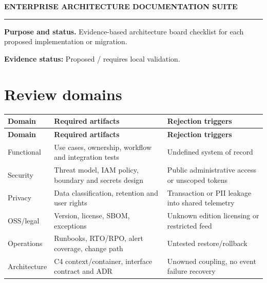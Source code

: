 \documentclass[10pt,letterpaper]{article}
\begin{document}
\begin{center}
{\large\bfseries\color{teal} ENTERPRISE ARCHITECTURE DOCUMENTATION SUITE}\par
{}\par
{}\par
\end{center}
\vspace{8pt}\hrule\vspace{12pt}
\textbf{Purpose and status.} Evidence-based architecture board checklist for each proposed implementation or migration.\par
\textbf{Evidence status:} Proposed / requires local validation.\par
\section{Review domains}
\small\begin{longtable}{>{\raggedright\arraybackslash}p{}>{\raggedright\arraybackslash}p{}>{\raggedright\arraybackslash}p{}}
\toprule
\textbf{Domain} & \textbf{Required artifacts} & \textbf{Rejection triggers}\\
\midrule\endfirsthead
\toprule
\textbf{Domain} & \textbf{Required artifacts} & \textbf{Rejection triggers}\\
\midrule\endhead
Functional & Use cases, ownership, workflow and integration tests & Undefined system of record\\
Security & Threat model, IAM policy, boundary and secrets design & Public administrative access or unscoped tokens\\
Privacy & Data classification, retention and user rights & Transaction or PII leakage into shared telemetry\\
OSS/legal & Version, license, SBOM, exceptions & Unknown edition licensing or restricted feed\\
Operations & Runbooks, RTO/RPO, alert coverage, change path & Untested restore/rollback\\
Architecture & C4 context/container, interface contract and ADR & Unowned coupling, no event failure recovery\\
\bottomrule
\end{longtable}
\normalsize
\end{document}
